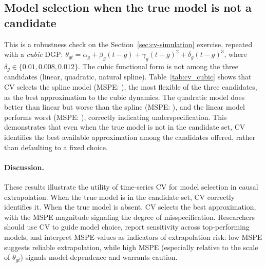 \subsection{Model selection when the true model is not a candidate}\label{sec:cv-robustness}

This is a robustness check on the Section~\ref{sec:cv-simulation} exercise, repeated with a \emph{cubic} DGP: $\theta_{gt} = \alpha_g + \beta_g (t - g) + \gamma_g (t - g)^2 + \delta_g (t - g)^3$, where $\delta_g \in \{0.01, 0.008, 0.012\}$. The cubic functional form is not among the three candidates (linear, quadratic, natural spline). Table~\ref{tab:cv_cubic} shows that CV selects the spline model (MSPE: \cvCubicBestMSPE), the most flexible of the three candidates, as the best approximation to the cubic dynamics. The quadratic model does better than linear but worse than the spline (MSPE: \cvCubicQuadraticMSPE), and the linear model performs worst (MSPE: \cvCubicLinearMSPE), correctly indicating underspecification. This demonstrates that even when the true model is not in the candidate set, CV identifies the best available approximation among the candidates offered, rather than defaulting to a fixed choice.



\paragraph{Discussion.}
These results illustrate the utility of time-series CV for model selection in causal extrapolation. When the true model is in the candidate set, CV correctly identifies it. When the true model is absent, CV selects the best approximation, with the MSPE magnitude signaling the degree of misspecification. Researchers should use CV to guide model choice, report sensitivity across top-performing models, and interpret MSPE values as indicators of extrapolation risk: low MSPE suggests reliable extrapolation, while high MSPE (especially relative to the scale of $\theta_{gt}$) signals model-dependence and warrants caution.
